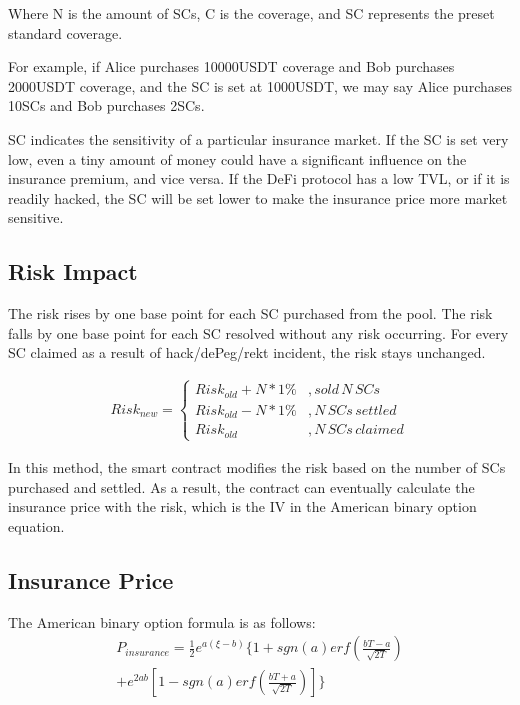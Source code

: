 Where N is the amount of SCs, C is the coverage, and SC represents the preset standard coverage.

For example, if Alice purchases 10000USDT coverage and Bob purchases 2000USDT coverage, and the SC is set at 1000USDT, we may say Alice purchases 10SCs and Bob purchases 2SCs.

SC indicates the sensitivity of a particular insurance market.
If the SC is set very low, even a tiny amount of money could have a significant influence on the insurance premium, and vice versa.
If the DeFi protocol has a low TVL, or if it is readily hacked, the SC will be set lower to make the insurance price more market sensitive.

\subsection{Risk Impact}\label{subsec:risk-impact}

The risk rises by one base point for each SC purchased from the pool.
The risk falls by one base point for each SC resolved without any risk occurring.
For every SC claimed as a result of hack/dePeg/rekt incident, the risk stays unchanged.

\begin{align} Risk_{new} = \left\{
\begin{aligned}
Risk_{old} + N * 1\%&, {sold\,N\,SCs}\\
Risk_{old} - N * 1\%&, {N\,SCs\,settled} \\
Risk_{old} &, {N\,SCs\,claimed}
\end{aligned}\right.
\end{align}

In this method, the smart contract modifies the risk based on the number of SCs purchased and settled.
As a result, the contract can eventually calculate the insurance price with the risk, which is the IV in the American binary option equation.

\subsection{Insurance Price}\label{subsec:insurance-price}
The American binary option formula is as follows:
\begin{equation}
	\begin{split}
	     P_{insurance} =
			\frac{1}{2}e^{a(\xi-b)}\{1+sgn(a){erf}\left(\frac{bT-a}{\sqrt {2T}}\right) \\
	+ e^{2ab}[1-sgn(a){erf}(\frac{bT+a}{\sqrt {2T}})] \}
	\end{split}\label{eq:American binary option}
\end{equation}

